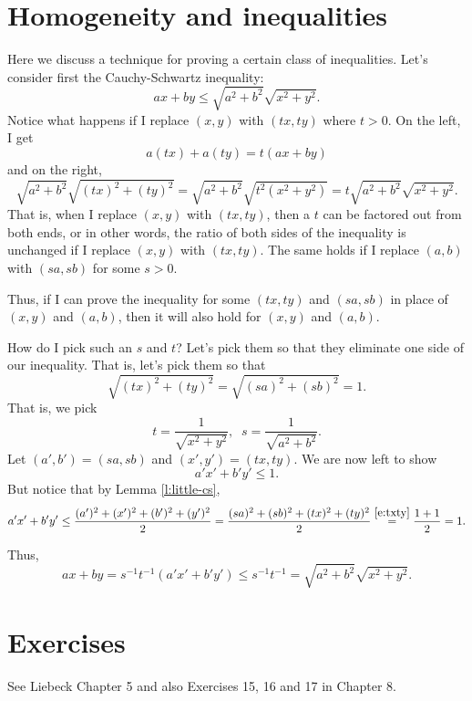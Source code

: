 \documentclass[11pt,dvipsnames]{book}
\numberwithin{figure}{section} %
\numberwithin{table}{section} %
\begin{document}
\section{Homogeneity and inequalities}%
\label{homogeneity}

Here we discuss a technique for proving a certain class of inequalities. Let's consider first the Cauchy-Schwartz inequality:
\[
ax+by \leq \sqrt{a^2+b^2}\sqrt{x^2+y^2}.
\]
Notice what happens if I replace $(x,y)$ with $(tx,ty)$ where $t>0$. On the left, I get
\[
a(tx)+a(ty)=t(ax+by)
\]
and on the right,
\[
\sqrt{a^2+b^2}\sqrt{(tx)^2+(ty)^2}
=\sqrt{a^2+b^2}\sqrt{t^2(x^2+y^2)}
=t \sqrt{a^2+b^2}\sqrt{x^2+y^2}.
\]
That is, when I replace $(x,y)$ with $(tx,ty)$, then a $t$ can be factored out from both ends, or in other words, the ratio of both sides of the inequality is unchanged if I replace $(x,y)$ with $(tx,ty)$. The same holds if I replace $(a,b)$ with $(sa,sb)$ for some $s>0$.

Thus, if I can prove the inequality for some $(tx,ty)$ and $(sa,sb)$ in place of $(x,y)$ and $(a,b)$, then it will also hold for $(x,y)$ and $(a,b)$.

How do I pick such an $s$ and $t$? Let's pick them so that they eliminate one side of our inequality. That is, let's pick them so that
\begin{equation}
\label{e:txty}
\sqrt{(tx)^2+(ty)^2}=\sqrt{(sa)^2+(sb)^2}=1.
\end{equation}
That is, we pick
\[
t=\frac{1}{\sqrt{x^2+y^{2}}}, \;\; s= \frac{1}{\sqrt{a^2+b^2}}.
\]
Let $(a',b')=(sa,sb)$ and $(x',y')=(tx,ty)$. We are now left to show
\[
a'x'+b'y'\leq 1.
\]
But notice that by Lemma \ref{l:little-cs},
\[
a'x'+b'y'\leq \frac{(a')^2 +(x')^2 + (b')^2 + (y')^2 }{2}
=\frac{(sa)^2+(sb)^2 + (tx)^2+(ty)^2}{2} \stackrel{\eqref{e:txty}}{=}\frac{1+1}{2}=1.
\]

Thus,
\[
ax+by =s^{-1}t^{-1} (a'x'+b'y')\leq s^{-1} t^{-1}=\sqrt{a^2+b^2}\sqrt{x^2+y^2}.
\]

\section{Exercises}%
\label{inequalitiesexercises}

See Liebeck Chapter 5 and also Exercises 15, 16 and 17 in Chapter 8.

\end{document}

